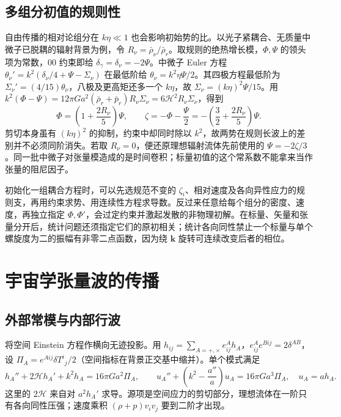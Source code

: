 \subsection{多组分初值的规则性}

自由传播的相对论组分在 $k\eta\ll1$ 也会影响初始势的比。以光子紧耦合、无质量中微子已脱耦的辐射背景为例，令 $R_\nu=\bar\rho_\nu/\bar\rho_r$。取规则的绝热增长模，$\Phi,\Psi$ 的领头项为常数，$00$ 约束即给 $\delta_\gamma=\delta_\nu=-2\Psi$。中微子 Euler 方程 $\theta_\nu'=k^2(\delta_\nu/4+\Psi-\Sigma_\nu)$ 在最低阶给 $\theta_\nu=k^2\eta\Psi/2$。其四极方程最低阶为 $\Sigma_\nu'=(4/15)\theta_\nu$，八极及更高矩还多一个 $k\eta$，故 $\Sigma_\nu=(k\eta)^2\Psi/15$。用 $k^2(\Phi-\Psi)=12\pi G a^2(\bar\rho_r+\bar p_r)R_\nu\Sigma_\nu=6\mathcal H^2R_\nu\Sigma_\nu$，得到
\[
 \Phi=\left(1+\frac{2R_\nu}{5}\right)\Psi,\qquad
 \zeta=-\Phi-\frac{\Psi}{2}
      =-\left(\frac32+\frac{2R_\nu}{5}\right)\Psi .
\]
剪切本身虽有 $(k\eta)^2$ 的抑制，约束中却同时除以 $k^2$，故两势在规则长波上的差别并不必须同阶消失。若取 $R_\nu=0$，便还原理想辐射流体先前使用的 $\Psi=-2\zeta/3$。同一批中微子对张量模造成的是时间卷积；标量初值的这个常系数不能拿来当作张量的阻尼因子。

初始化一组耦合方程时，可以先选规范不变的 $\zeta_i$、相对速度及各向异性应力的规则支，再用约束求势、用连续性方程求导数。反过来任意给每个组分的密度、速度，再独立指定 $\Phi,\Phi'$，会过定约束并激起发散的非物理初解。在标量、矢量和张量分开后，统计问题还须指定它们的原初相关；统计各向同性禁止一个标量与单个螺旋度为二的振幅有非零二点函数，因为绕 $\bm k$ 旋转可连续改变后者的相位。
\section{宇宙学张量波的传播}\label{sec:gw-dtensor}

\subsection{外部常模与内部行波}

将空间 Einstein 方程作横向无迹投影。用 $h_{ij}=\sum_{A=+,\times}e^A_{ij}h_A$，$e^A_{ij}e^{Bij}=2\delta^{AB}$，设 $\Pi_A=e^{Aij}\delta T^i{}_j/2$（空间指标在背景正交基中缩并）。单个模式满足
\begin{equation}\label{eq:gw-d-wave}
 h_A''+2\mathcal Hh_A'+k^2h_A=16\pi G a^2\Pi_A,\qquad
 u_A''+\left(k^2-\frac{a''}{a}\right)u_A=16\pi G a^3\Pi_A,\quad u_A=ah_A.
\end{equation}
这里的 $2\mathcal H$ 来自对 $a^2 h_A'$ 求导。源项是空间应力的剪切部分，理想流体在一阶只有各向同性压强；速度乘积 $(\rho+p)v_iv_j$ 要到二阶才出现。

